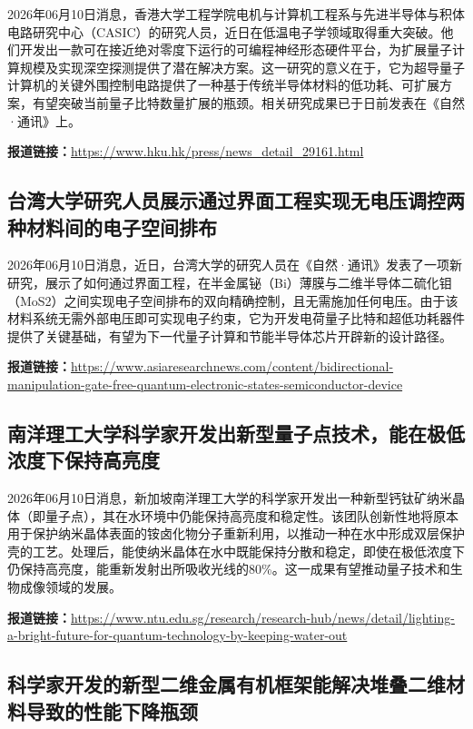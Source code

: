 \documentclass[12pt,a4paper]{ctexart}
\begin{document}
2026年06月10日消息，香港大学工程学院电机与计算机工程系与先进半导体与积体电路研究中心（CASIC）的研究人员，近日在低温电子学领域取得重大突破。他们开发出一款可在接近绝对零度下运行的可编程神经形态硬件平台，为扩展量子计算规模及实现深空探测提供了潜在解决方案。这一研究的意义在于，它为超导量子计算机的关键外围控制电路提供了一种基于传统半导体材料的低功耗、可扩展方案，有望突破当前量子比特数量扩展的瓶颈。相关研究成果已于日前发表在《自然·通讯》上。

\noindent\textbf{报道链接：}\url{https://www.hku.hk/press/news\_detail\_29161.html}

\subsection{ 台湾大学研究人员展示通过界面工程实现无电压调控两种材料间的电子空间排布 }

2026年06月10日消息，近日，台湾大学的研究人员在《自然·通讯》发表了一项新研究，展示了如何通过界面工程，在半金属铋（Bi）薄膜与二维半导体二硫化钼（MoS2）之间实现电子空间排布的双向精确控制，且无需施加任何电压。由于该材料系统无需外部电压即可实现电子约束，它为开发电荷量子比特和超低功耗器件提供了关键基础，有望为下一代量子计算和节能半导体芯片开辟新的设计路径。

\noindent\textbf{报道链接：}\url{https://www.asiaresearchnews.com/content/bidirectional-manipulation-gate-free-quantum-electronic-states-semiconductor-device}

\subsection{ 南洋理工大学科学家开发出新型量子点技术，能在极低浓度下保持高亮度 }

2026年06月10日消息，新加坡南洋理工大学的科学家开发出一种新型钙钛矿纳米晶体（即量子点），其在水环境中仍能保持高亮度和稳定性。该团队创新性地将原本用于保护纳米晶体表面的铵卤化物分子重新利用，以推动一种在水中形成双层保护壳的工艺。处理后，能使纳米晶体在水中既能保持分散和稳定，即使在极低浓度下仍保持高亮度，能重新发射出所吸收光线的80\%。这一成果有望推动量子技术和生物成像领域的发展。

\noindent\textbf{报道链接：}\url{https://www.ntu.edu.sg/research/research-hub/news/detail/lighting-a-bright-future-for-quantum-technology-by-keeping-water-out}

\subsection{ 科学家开发的新型二维金属有机框架能解决堆叠二维材料导致的性能下降瓶颈 }
\end{document}

